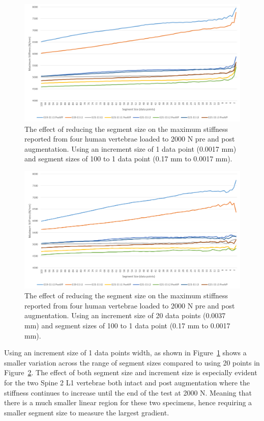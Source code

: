 \begin{figure}[ht!]
  \centering
  \includegraphics[width=6in]{Chapters/Chapter_HT_images/findStiffness_1incr.png}
  \caption{The effect of reducing the segment size on the maximum stiffness
    reported from four human vertebrae loaded to 2000 N pre and post
    augmentation. Using an increment size of 1 data point (0.0017 mm) and
    segment sizes of 100 to 1 data point (0.17 mm to 0.0017 mm).}
  \label{fig:findStiffness_1incr}
\end{figure}

\begin{figure}[ht!]
  \centering
  \includegraphics[width=6in]{Chapters/Chapter_HT_images/findStiffness_20incr.png}
  \caption{The effect of reducing the segment size on the maximum stiffness
    reported from four human vertebrae loaded to 2000 N pre and post
    augmentation. Using an increment size of 20 data points (0.0037 mm) and
    segment sizes of 100 to 1 data point (0.17 mm to 0.0017 mm).}
  \label{fig:findStiffness_20incr}
\end{figure}

Using an increment size of 1 data points width, as shown in Figure~\ref{fig:findStiffness_1incr} shows a smaller variation across the range of
segment sizes compared to using 20 points in Figure~\ref{fig:findStiffness_20incr}. The effect of both segment size and increment
size is especially evident for the two Spine 2 L1 vertebrae both intact and post
augmentation where the stiffness continues to increase until the end of the test
at 2000 N. Meaning that there is a much smaller linear region for these two
specimens, hence requiring a smaller segment size to measure the largest
gradient.

